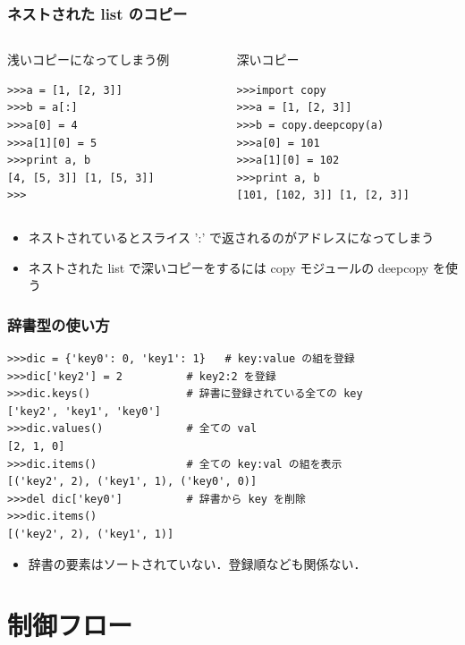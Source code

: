\begin{frame}[t,fragile]
\frametitle{ネストされた list のコピー}
\begin{columns}
\begin{column}{6cm}
浅いコピーになってしまう例
\begin{lstlisting}
>>>a = [1, [2, 3]]
>>>b = a[:]
>>>a[0] = 4
>>>a[1][0] = 5
>>>print a, b
[4, [5, 3]] [1, [5, 3]]
>>>
\end{lstlisting}
\end{column}

\begin{column}{6cm}
深いコピー
\begin{lstlisting}
>>>import copy
>>>a = [1, [2, 3]]
>>>b = copy.deepcopy(a)
>>>a[0] = 101
>>>a[1][0] = 102
>>>print a, b
[101, [102, 3]] [1, [2, 3]]
\end{lstlisting}
\end{column}
\end{columns}

\begin{itemize}
\item ネストされているとスライス ':' で返されるのがアドレスになってしまう
\item ネストされた list で深いコピーをするには copy モジュールの deepcopy を使う
\end{itemize}

\end{frame}


\begin{frame}[t,fragile]
\frametitle{辞書型の使い方}
\begin{lstlisting}
>>>dic = {'key0': 0, 'key1': 1}   # key:value の組を登録
>>>dic['key2'] = 2          # key2:2 を登録
>>>dic.keys()               # 辞書に登録されている全ての key
['key2', 'key1', 'key0']
>>>dic.values()             # 全ての val
[2, 1, 0]
>>>dic.items()              # 全ての key:val の組を表示
[('key2', 2), ('key1', 1), ('key0', 0)]  
>>>del dic['key0']          # 辞書から key を削除
>>>dic.items()
[('key2', 2), ('key1', 1)]
\end{lstlisting}

\begin{itemize}
\item 辞書の要素はソートされていない．登録順なども関係ない．
\end{itemize}
\end{frame}

\section{制御フロー}

